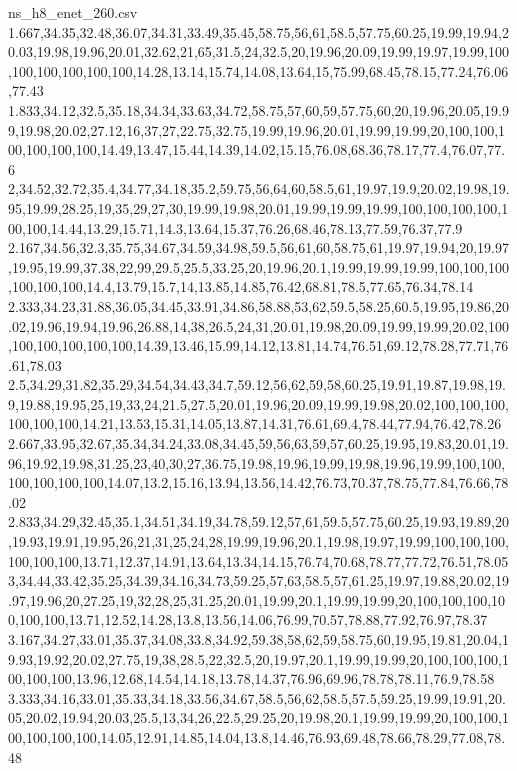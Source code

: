 \begin{filecontents*}[overwrite]{ns_h8_enet_260.csv}
1.667,34.35,32.48,36.07,34.31,33.49,35.45,58.75,56,61,58.5,57.75,60.25,19.99,19.94,20.03,19.98,19.96,20.01,32.62,21,65,31.5,24,32.5,20,19.96,20.09,19.99,19.97,19.99,100,100,100,100,100,100,14.28,13.14,15.74,14.08,13.64,15,75.99,68.45,78.15,77.24,76.06,77.43
1.833,34.12,32.5,35.18,34.34,33.63,34.72,58.75,57,60,59,57.75,60,20,19.96,20.05,19.99,19.98,20.02,27.12,16,37,27,22.75,32.75,19.99,19.96,20.01,19.99,19.99,20,100,100,100,100,100,100,14.49,13.47,15.44,14.39,14.02,15.15,76.08,68.36,78.17,77.4,76.07,77.6
2,34.52,32.72,35.4,34.77,34.18,35.2,59.75,56,64,60,58.5,61,19.97,19.9,20.02,19.98,19.95,19.99,28.25,19,35,29,27,30,19.99,19.98,20.01,19.99,19.99,19.99,100,100,100,100,100,100,14.44,13.29,15.71,14.3,13.64,15.37,76.26,68.46,78.13,77.59,76.37,77.9
2.167,34.56,32.3,35.75,34.67,34.59,34.98,59.5,56,61,60,58.75,61,19.97,19.94,20,19.97,19.95,19.99,37.38,22,99,29.5,25.5,33.25,20,19.96,20.1,19.99,19.99,19.99,100,100,100,100,100,100,14.4,13.79,15.7,14,13.85,14.85,76.42,68.81,78.5,77.65,76.34,78.14
2.333,34.23,31.88,36.05,34.45,33.91,34.86,58.88,53,62,59.5,58.25,60.5,19.95,19.86,20.02,19.96,19.94,19.96,26.88,14,38,26.5,24,31,20.01,19.98,20.09,19.99,19.99,20.02,100,100,100,100,100,100,14.39,13.46,15.99,14.12,13.81,14.74,76.51,69.12,78.28,77.71,76.61,78.03
2.5,34.29,31.82,35.29,34.54,34.43,34.7,59.12,56,62,59,58,60.25,19.91,19.87,19.98,19.9,19.88,19.95,25,19,33,24,21.5,27.5,20.01,19.96,20.09,19.99,19.98,20.02,100,100,100,100,100,100,14.21,13.53,15.31,14.05,13.87,14.31,76.61,69.4,78.44,77.94,76.42,78.26
2.667,33.95,32.67,35.34,34.24,33.08,34.45,59,56,63,59,57,60.25,19.95,19.83,20.01,19.96,19.92,19.98,31.25,23,40,30,27,36.75,19.98,19.96,19.99,19.98,19.96,19.99,100,100,100,100,100,100,14.07,13.2,15.16,13.94,13.56,14.42,76.73,70.37,78.75,77.84,76.66,78.02
2.833,34.29,32.45,35.1,34.51,34.19,34.78,59.12,57,61,59.5,57.75,60.25,19.93,19.89,20,19.93,19.91,19.95,26,21,31,25,24,28,19.99,19.96,20.1,19.98,19.97,19.99,100,100,100,100,100,100,13.71,12.37,14.91,13.64,13.34,14.15,76.74,70.68,78.77,77.72,76.51,78.05
3,34.44,33.42,35.25,34.39,34.16,34.73,59.25,57,63,58.5,57,61.25,19.97,19.88,20.02,19.97,19.96,20,27.25,19,32,28,25,31.25,20.01,19.99,20.1,19.99,19.99,20,100,100,100,100,100,100,13.71,12.52,14.28,13.8,13.56,14.06,76.99,70.57,78.88,77.92,76.97,78.37
3.167,34.27,33.01,35.37,34.08,33.8,34.92,59.38,58,62,59,58.75,60,19.95,19.81,20.04,19.93,19.92,20.02,27.75,19,38,28.5,22,32.5,20,19.97,20.1,19.99,19.99,20,100,100,100,100,100,100,13.96,12.68,14.54,14.18,13.78,14.37,76.96,69.96,78.78,78.11,76.9,78.58
3.333,34.16,33.01,35.33,34.18,33.56,34.67,58.5,56,62,58.5,57.5,59.25,19.99,19.91,20.05,20.02,19.94,20.03,25.5,13,34,26,22.5,29.25,20,19.98,20.1,19.99,19.99,20,100,100,100,100,100,100,14.05,12.91,14.85,14.04,13.8,14.46,76.93,69.48,78.66,78.29,77.08,78.48

\end{filecontents*}
